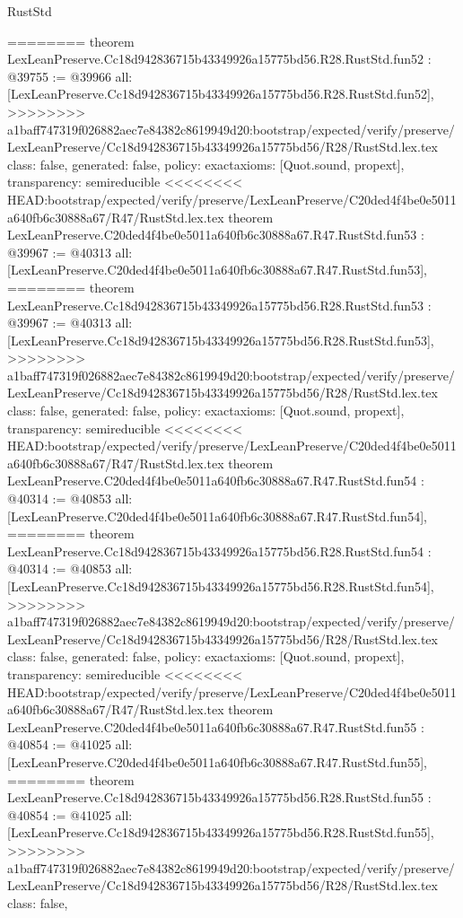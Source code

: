 \begin{lexlean}{RustStd}
\begin{coremodule}
{\begin{coremodule}
{{{{{{{{{{{{{{{{{{{{{{{{{{{{{{{{{{{{{{{{{{{{{{{{{{{{{{{========
theorem LexLeanPreserve.Cc18d942836715b43349926a15775bd56.R28.RustStd.fun52 : @39755 := @39966 {
  all: [LexLeanPreserve.Cc18d942836715b43349926a15775bd56.R28.RustStd.fun52],
>>>>>>>> a1baff747319f026882aec7e84382c8619949d20:bootstrap/expected/verify/preserve/LexLeanPreserve/Cc18d942836715b43349926a15775bd56/R28/RustStd.lex.tex
  class: false,
  generated: false,
  policy: exact{axioms: [Quot.sound, propext]},
  transparency: semireducible
}
<<<<<<<< HEAD:bootstrap/expected/verify/preserve/LexLeanPreserve/C20ded4f4be0e5011a640fb6c30888a67/R47/RustStd.lex.tex
theorem LexLeanPreserve.C20ded4f4be0e5011a640fb6c30888a67.R47.RustStd.fun53 : @39967 := @40313 {
  all: [LexLeanPreserve.C20ded4f4be0e5011a640fb6c30888a67.R47.RustStd.fun53],
========
theorem LexLeanPreserve.Cc18d942836715b43349926a15775bd56.R28.RustStd.fun53 : @39967 := @40313 {
  all: [LexLeanPreserve.Cc18d942836715b43349926a15775bd56.R28.RustStd.fun53],
>>>>>>>> a1baff747319f026882aec7e84382c8619949d20:bootstrap/expected/verify/preserve/LexLeanPreserve/Cc18d942836715b43349926a15775bd56/R28/RustStd.lex.tex
  class: false,
  generated: false,
  policy: exact{axioms: [Quot.sound, propext]},
  transparency: semireducible
}
<<<<<<<< HEAD:bootstrap/expected/verify/preserve/LexLeanPreserve/C20ded4f4be0e5011a640fb6c30888a67/R47/RustStd.lex.tex
theorem LexLeanPreserve.C20ded4f4be0e5011a640fb6c30888a67.R47.RustStd.fun54 : @40314 := @40853 {
  all: [LexLeanPreserve.C20ded4f4be0e5011a640fb6c30888a67.R47.RustStd.fun54],
========
theorem LexLeanPreserve.Cc18d942836715b43349926a15775bd56.R28.RustStd.fun54 : @40314 := @40853 {
  all: [LexLeanPreserve.Cc18d942836715b43349926a15775bd56.R28.RustStd.fun54],
>>>>>>>> a1baff747319f026882aec7e84382c8619949d20:bootstrap/expected/verify/preserve/LexLeanPreserve/Cc18d942836715b43349926a15775bd56/R28/RustStd.lex.tex
  class: false,
  generated: false,
  policy: exact{axioms: [Quot.sound, propext]},
  transparency: semireducible
}
<<<<<<<< HEAD:bootstrap/expected/verify/preserve/LexLeanPreserve/C20ded4f4be0e5011a640fb6c30888a67/R47/RustStd.lex.tex
theorem LexLeanPreserve.C20ded4f4be0e5011a640fb6c30888a67.R47.RustStd.fun55 : @40854 := @41025 {
  all: [LexLeanPreserve.C20ded4f4be0e5011a640fb6c30888a67.R47.RustStd.fun55],
========
theorem LexLeanPreserve.Cc18d942836715b43349926a15775bd56.R28.RustStd.fun55 : @40854 := @41025 {
  all: [LexLeanPreserve.Cc18d942836715b43349926a15775bd56.R28.RustStd.fun55],
>>>>>>>> a1baff747319f026882aec7e84382c8619949d20:bootstrap/expected/verify/preserve/LexLeanPreserve/Cc18d942836715b43349926a15775bd56/R28/RustStd.lex.tex
  class: false,
}}}}}}}}}}}}}}}}}}}}}}}}}}}}}}}}}}}}}}}}}}}}}}}}}}}}}}}}}}}
\end{coremodule}}
\end{coremodule}
\end{lexlean}

